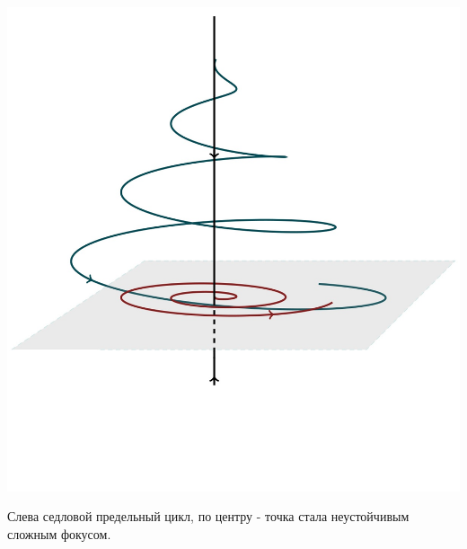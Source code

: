 \begin{center}
\begin{minipage}{0.3\linewidth}
        \vspace{-50pt}
        \label{fig:1}
    \end{minipage}
\hfill     
    \begin{minipage}{0.3\linewidth}
        \includegraphics[width=\linewidth]{fig/fig59.jpg} 
        \vspace{-50pt}
        \label{fig:1}
    \end{minipage}    
\end{center}

Слева седловой предельный цикл, по центру - точка стала неустойчивым сложным фокусом.

